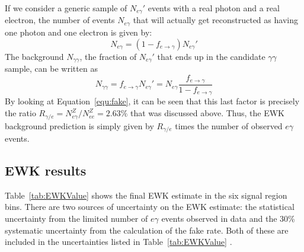 If we consider a generic sample of $N_{e\gamma}'$ events with a real photon and a real electron, 
the number of events $N_{e\gamma}$ that will actually get reconstructed as having one photon and one electron is given by:
\begin{equation}
N_{e\gamma}=(1-f_{e\rightarrow\gamma})N_{e\gamma}'
\end{equation}
The background $N_{\gamma\gamma}$, the fraction of $N_{e\gamma}'$ that ends up in the candidate
$\gamma\gamma$ sample, can be written as
\begin{equation}
N_{\gamma\gamma} = f_{e\rightarrow\gamma} N_{e\gamma}' = N_{e\gamma}\frac{f_{e\rightarrow\gamma}}{1-f_{e\rightarrow\gamma}}
\end{equation}
By looking at Equation~\ref{equ:fake}, it can be seen that this last factor is precisely the ratio $R_{\gamma/e} = N_{e\gamma}^Z/N_{ee}^Z = 2.63\%$ that was discussed above. Thus, the EWK background prediction is simply given by $R_{\gamma/e}$ times the number of observed $e\gamma$ events. 


\subsection{EWK results}
\label{sec:EWKresults}

Table~\ref{tab:EWKValue} shows the final EWK estimate in the six signal region bins. There are two sources of uncertainty on the EWK estimate: the statistical uncertainty from the limited number of $e\gamma$ events observed in data and the 30\% systematic uncertainty from the calculation of the fake rate. Both of these are included in the uncertainties listed in Table~\ref{tab:EWKValue} .


